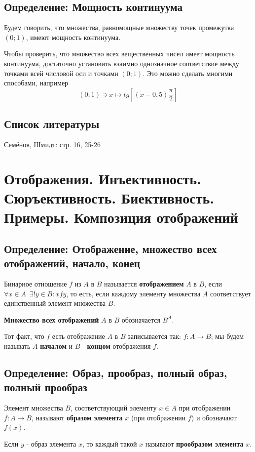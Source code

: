 \documentclass{article}
\begin{document}
\subsection{Определение: Мощность континуума}
Будем говорить, что множества, равномощные множеству точек промежутка $(0; 1)$, имеют мощность континуума.

Чтобы проверить, что множество всех вещественных чисел имеет мощность континуума, достаточно установить взаимно однозначное соответствие между точками всей числовой оси и точками $(0; 1)$. Это можно сделать многими способами, например \[ (0; 1) \ni x \mapsto tg[(x - 0,5)\frac{\pi}{2}] \]	

\subsection*{Список литературы}
Семёнов, Шмидт: стр. 16, 25-26

\newpage
\section{Отображения. Инъективность. Сюръективность. Биективность. Примеры. Композиция отображений}
\subsection{Определение: Отображение, множество всех отображений, начало, конец}
Бинарное отношение $f$ из $A$ в $B$ называется \textbf{отображением} $A$ в $B$, если ${\forall x \in A \enspace \exists!y \in B : xfy}$, то есть, если каждому элементу множества $A$ соответствует единственный элемент множества $B$.

\textbf{Множество всех отображений} $A$ в $B$ обозначается $B^A$.

Тот факт, что $f$ есть отображение $A$ в $B$ записывается так: $f: A \rightarrow B$; мы будем называть $A$ \textbf{началом} и $B$ - \textbf{концом} отображения $f$.

\subsection{Определение: Образ, прообраз, полный образ, полный прообраз}
Элемент множества $B$, соответствующий элементу $x \in A$ при отображении $f: A \rightarrow B$, называют \textbf{образом элемента} $x$ (при отображении $f$) и обозначают $f(x)$.

Если $y$ - образ элемента $x$, то каждый такой $x$ называют \textbf{прообразом элемента} $x$.
\end{document}
